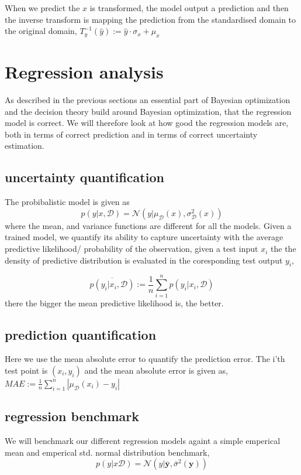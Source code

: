 When we predict the $x$ is transformed, the model output a prediction 
and then the inverse transform is mapping the prediction from the standardised
domain to the original domain, 
 $T^{-1}_y(\hat y) := \hat y \cdot \sigma_x+\mu_x$


\section{Regression analysis}
As described in the previous sections an essential part of Bayesian optimization and the decision theory build 
around Bayesian optimization, that the regression model is correct. We will therefore look at how good the
regression models are, both in terms of correct prediction and in terms of correct uncertainty estimation. 

\subsection{uncertainty quantification}
The probibalistic model is given as 
$$p(y|x,\mathcal{D}) = \mathcal{N}(y|\mu_{\mathcal{D}}(x), \sigma_{\mathcal{D}}^2(x))$$
where the mean, and variance functions are different for all the models. 
Given a trained model, we quantify its ability to capture uncertainty with the average
predictive likelihood/ probability of the observation, given a test input $x_i$ the
the density of predictive distribution is evaluated in the coresponding test output $y_i$,

$$\overline{p(y_i|x_i,\mathcal{D})} := \frac{1}{n}\sum_{i=1}^n p(y_i|x_i,\mathcal{D})$$
there the bigger the mean predictive likelihood is, the better. 

\subsection{prediction quantification}
Here we use the mean absolute error to quantify the prediction error. The i'th test point is
$(x_i,y_i)$ and the mean absolute error is given as, 
$MAE :=\frac{1}{n}\sum_{i=1}^n |\mu_{\mathcal{D}}(x_i) - y_i| $

\subsection{regression benchmark}
We will benchmark our different regression models againt a simple emperical mean and
emperical std. normal distribution benchmark, 
$$p(y|x\mathcal{D}) = \mathcal{N}(y| \bar{\textbf{y}} , \bar{\sigma}^2 (\textbf{y}))$$

